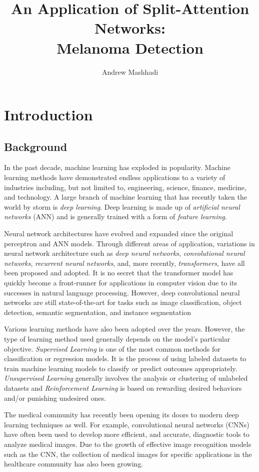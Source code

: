 \documentclass [MAS] {uclathes}
\title          {An Application of Split-Attention Networks:\\
                Melanoma Detection}
\author         {Andrew Mashhadi}
\begin{document}
\makeintropages


\chapter{Introduction}

\section{Background}

In the past decade, machine learning has exploded in popularity. Machine learning methods have demonstrated endless applications to a variety of industries including, but not limited to, engineering, science, finance, medicine, and technology. A large branch of machine learning that has recently taken the world by storm is \textit{deep learning}. Deep learning is made up of \textit{artificial neural networks} (ANN) and is generally trained with a form of \textit{feature learning}. 

Neural network architectures have evolved and expanded since the original perceptron and ANN models. Through different areas of application, variations in neural network architecture such as \textit{deep neural networks}, \textit{convolutional neural networks}, \textit{recurrent neural networks}, and, more recently, \textit{transformers}, have all been proposed and adopted. It is no secret that the transformer model has quickly become a front-runner for applications in computer vision due to its successes in natural language processing. However, deep convolutional neural networks are still state-of-the-art for tasks such as image classification, object detection, semantic segmentation, and instance segmentation

Various learning methods have also been adopted over the years. However, the type of learning method used generally depends on the model's particular objective. \textit{Supervised Learning} is one of the most common methods for classification or regression models. It is the process of using labeled datasets to train machine learning models to classify or predict outcomes appropriately. \textit{Unsupervised Learning} generally involves the analysis or clustering of unlabeled datasets and \textit{Reinforcement Learning} is based on rewarding desired behaviors and/or punishing undesired ones.

The medical community has recently been opening its doors to modern deep learning techniques as well. For example, convolutional neural networks (CNNs) have often been used to develop more efficient, and accurate, diagnostic tools to analyze medical images. Due to the growth of effective image recognition models such as the CNN, the collection of medical images for specific applications in the healthcare community has also been growing. 
\end{document}
